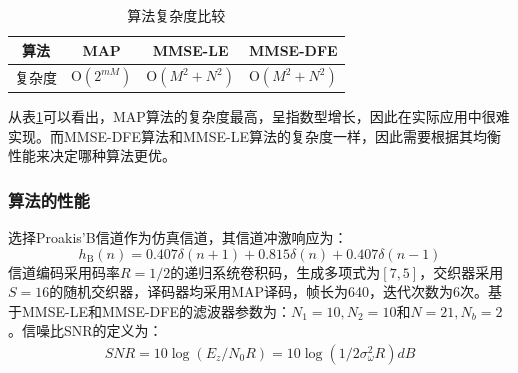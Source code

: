 \begin{table}[hbt]
  \centering
  \caption{算法复杂度比较}
  \label{tab:2.1}
  \begin{threeparttable}
  \begin{tabular}{cccc}
    \hline
    算法&MAP&MMSE-LE&MMSE-DFE\\
    \hline
    复杂度&$\mathrm{O}(2^{mM})$&$\mathrm{O}(M^2+N^2)$&$\mathrm{O}(M^2+N^2)$\\
    \hline
  \end{tabular}
\end{threeparttable}
\end{table}

从表\ref{tab:2.1}可以看出，MAP算法的复杂度最高，呈指数型增长，因此在实际应用中很难实现。而MMSE-DFE算法和MMSE-LE算法的复杂度一样，因此需要根据其均衡性能来决定哪种算法更优。
\subsubsection*{算法的性能}
选择Proakis'B信道作为仿真信道，其信道冲激响应为：
\begin{equation}
    h_{\mathrm{B}}(n)=0.407\delta(n+1)+0.815\delta(n)+0.407\delta(n-1)
    \label{equ:2.36}
\end{equation}
信道编码采用码率$R=1/2$的递归系统卷积码，生成多项式为$[7,5]$，交织器采用$S=16$的随机交织器，译码器均采用MAP译码，帧长为640，迭代次数为6次。基于MMSE-LE和MMSE-DFE的滤波器参数为：$N_1=10,N_2=10$和$N=21,N_b=2$。信噪比SNR的定义为：
\begin{eqnarray}
    SNR=10\log(E_z/N_0R)=10\log(1/2\sigma^2_\omega R)dB
    \label{equ:2.37}
\end{eqnarray}


